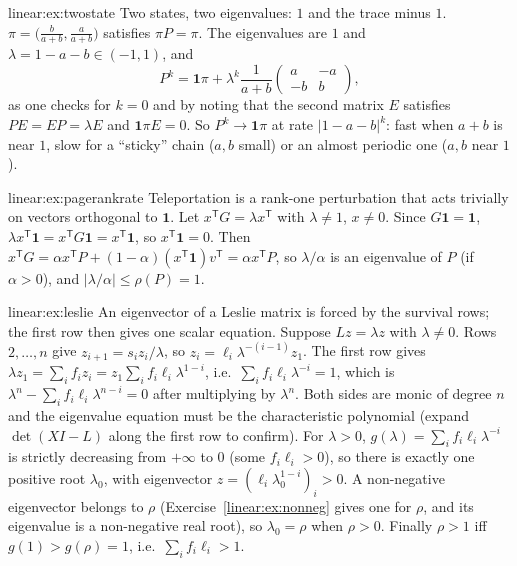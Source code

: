\begin{solution}{linear:ex:twostate}
\idea Two states, two eigenvalues: $1$ and the trace minus $1$.
\writeup $\pi=\bigl(\frac b{a+b},\frac a{a+b}\bigr)$ satisfies $\pi P=\pi$. The eigenvalues are $1$ and $\lambda=1-a-b\in(-1,1)$,
and
\[
P^k=\mathbf 1\pi+\lambda^k\frac1{a+b}\begin{pmatrix}a&-a\\-b&b\end{pmatrix},
\]
as one checks for $k=0$ and by noting that the second matrix $E$ satisfies $PE=EP=\lambda E$ and $\mathbf 1\pi E=0$. So
$P^k\to\mathbf 1\pi$ at rate $|1-a-b|^k$: fast when $a+b$ is near $1$, slow for a ``sticky'' chain ($a,b$ small) or an almost
periodic one ($a,b$ near $1$).
\end{solution}

\begin{solution}{linear:ex:pagerankrate}
\idea Teleportation is a rank-one perturbation that acts trivially on vectors orthogonal to $\mathbf 1$.
\writeup Let $x^{\mathsf T}G=\lambda x^{\mathsf T}$ with $\lambda\ne1$, $x\ne0$. Since $G\mathbf 1=\mathbf 1$, $\lambda x^{\mathsf
T}\mathbf 1=x^{\mathsf T}G\mathbf 1=x^{\mathsf T}\mathbf 1$, so $x^{\mathsf T}\mathbf 1=0$. Then $x^{\mathsf T}G=\alpha x^{\mathsf T}P+
(1-\alpha)(x^{\mathsf T}\mathbf 1)v^{\mathsf T}=\alpha x^{\mathsf T}P$, so $\lambda/\alpha$ is an eigenvalue of $P$ (if $\alpha>0$),
and $|\lambda/\alpha|\le\rho(P)=1$.
\end{solution}

\begin{solution}{linear:ex:leslie}
\idea An eigenvector of a Leslie matrix is forced by the survival rows; the first row then gives one scalar equation.
\writeup Suppose $Lz=\lambda z$ with $\lambda\ne0$. Rows $2,\dots,n$ give $z_{i+1}=s_iz_i/\lambda$, so $z_i=\ell_i\lambda^{-(i-1)}z_1$.
The first row gives $\lambda z_1=\sum_if_iz_i=z_1\sum_if_i\ell_i\lambda^{1-i}$, i.e.\ $\sum_if_i\ell_i\lambda^{-i}=1$, which is
$\lambda^n-\sum_if_i\ell_i\lambda^{n-i}=0$ after multiplying by $\lambda^n$. Both sides are monic of degree $n$ and the
eigenvalue equation must be the characteristic polynomial (expand $\det(XI-L)$ along the first row to confirm). For $\lambda>0$,
$g(\lambda)=\sum_if_i\ell_i\lambda^{-i}$ is strictly decreasing from $+\infty$ to $0$ (some $f_i\ell_i>0$), so there is
exactly one positive root $\lambda_0$, with eigenvector $z=(\ell_i\lambda_0^{1-i})_i>0$. A non-negative eigenvector belongs to
$\rho$ (Exercise~\ref{linear:ex:nonneg} gives one for $\rho$, and its eigenvalue is a non-negative real root), so $\lambda_0=\rho$ when
$\rho>0$. Finally $\rho>1$ iff $g(1)>g(\rho)=1$, i.e.\ $\sum_if_i\ell_i>1$.
\end{solution}

